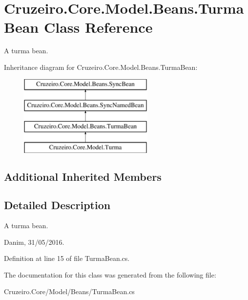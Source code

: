 \hypertarget{class_cruzeiro_1_1_core_1_1_model_1_1_beans_1_1_turma_bean}{}\section{Cruzeiro.\+Core.\+Model.\+Beans.\+Turma\+Bean Class Reference}
\label{class_cruzeiro_1_1_core_1_1_model_1_1_beans_1_1_turma_bean}


A turma bean.  


Inheritance diagram for Cruzeiro.\+Core.\+Model.\+Beans.\+Turma\+Bean\+:\begin{figure}[H]
\begin{center}
\leavevmode
\includegraphics[height=4.000000cm]{class_cruzeiro_1_1_core_1_1_model_1_1_beans_1_1_turma_bean}
\end{center}
\end{figure}
\subsection*{Additional Inherited Members}


\subsection{Detailed Description}
A turma bean. 

Danim, 31/05/2016. 

Definition at line 15 of file Turma\+Bean.\+cs.



The documentation for this class was generated from the following file\+:\begin{DoxyCompactItemize}
\item 
Cruzeiro.\+Core/\+Model/\+Beans/Turma\+Bean.\+cs\end{DoxyCompactItemize}
